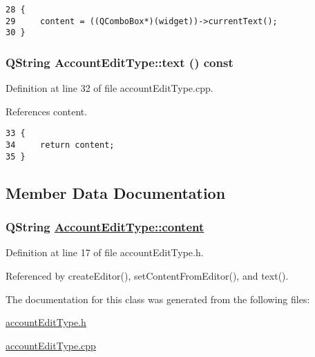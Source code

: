 \footnotesize\begin{verbatim}28 {
29     content = ((QComboBox*)(widget))->currentText();
30 }
\end{verbatim}\normalsize 


\hypertarget{classAccountEditType_a3}{
\subsubsection[text]{\setlength{\rightskip}{0pt plus 5cm}QString Account\-Edit\-Type::text () const}}
\label{classAccountEditType_a3}


Definition at line 32 of file account\-Edit\-Type.cpp.

References content.

\footnotesize\begin{verbatim}33 {
34     return content;
35 }
\end{verbatim}\normalsize 




\subsection{Member Data Documentation}
\hypertarget{classAccountEditType_r0}{
\subsubsection[content]{\setlength{\rightskip}{0pt plus 5cm}QString \hyperlink{classAccountEditType_r0}{Account\-Edit\-Type::content}}}
\label{classAccountEditType_r0}


Definition at line 17 of file account\-Edit\-Type.h.

Referenced by create\-Editor(), set\-Content\-From\-Editor(), and text().

The documentation for this class was generated from the following files:\begin{CompactItemize}
\item 
\hyperlink{accountEditType_8h}{account\-Edit\-Type.h}\item 
\hyperlink{accountEditType_8cpp}{account\-Edit\-Type.cpp}\end{CompactItemize}
